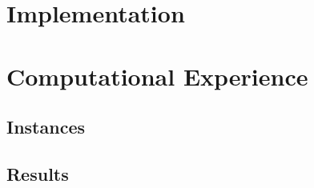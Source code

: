 \section{Implementation}

\section{Computational Experience}

\subsection{Instances}

\subsection{Results}


